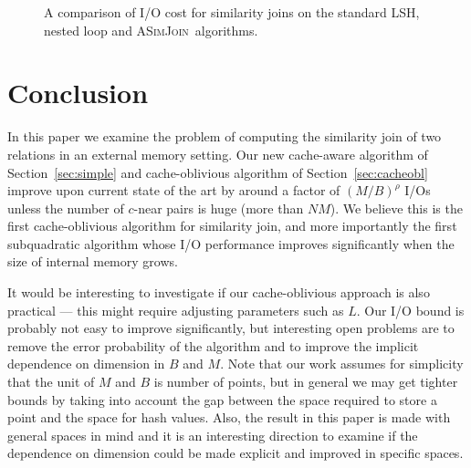 \documentclass{llncs}
\newcommand{\ASimJoin}{\textsc{ASimJoin}}
\begin{document}
\begin{figure*}[t]
\begin{center}
\label{fig:ASSJ}
\caption{A comparison of I/O cost for similarity joins on the standard LSH, nested loop and \ASimJoin\ algorithms.}
\end{center}
\end{figure*}




\section{Conclusion}\label{sec:concl}
In this paper we examine the problem of computing the similarity join of two relations in an external memory setting. 
Our new cache-aware algorithm of Section~\ref{sec:simple} and cache-oblivious algorithm of Section~\ref{sec:cacheobl} improve upon current state of the art by around a factor of $(M/B)^\rho$ I/Os unless the number of $c$-near pairs is huge (more than $NM$).
We believe this is the first cache-oblivious algorithm for similarity join, and more importantly the first subquadratic algorithm whose I/O performance improves significantly when the size of internal memory grows.


It would be interesting to investigate if our cache-oblivious approach is also practical --- this might require adjusting parameters such as $L$.
Our I/O bound is probably not easy to improve significantly, but interesting open problems are to remove the error probability of the algorithm and to improve the implicit dependence on dimension in $B$ and $M$. Note that our work assumes for simplicity that the unit of $M$ and $B$ is number of points, but in general we may get tighter bounds by taking into account the gap between the space required to store a point and the space for hash values.
Also, the result in this paper is made with general spaces in mind and it is an interesting direction to examine if the dependence on dimension could be made explicit and improved in specific spaces.




\end{document}
